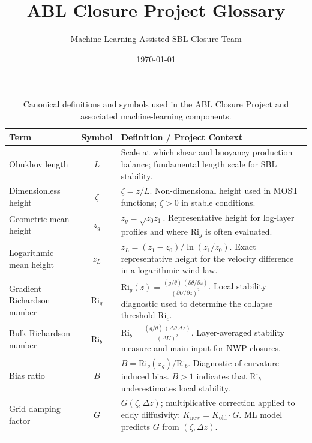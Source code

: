 \documentclass[11pt, a4paper]{article}
\title{ABL Closure Project Glossary}
\author{Machine Learning Assisted SBL Closure Team}
\date{\today}
\begin{document}
\begin{table}[t]
\centering
\renewcommand{\arraystretch}{1.35} %
\caption{Canonical definitions and symbols used in the ABL Closure Project and associated machine-learning components.}
\label{tab:abl-glossary}
\begin{tabularx}{\linewidth}{l c X}
\toprule
\textbf{Term} & \textbf{Symbol} & \textbf{Definition / Project Context} \\
\midrule

Obukhov length & $L$ & Scale at which shear and buoyancy production balance; fundamental length scale for SBL stability. \\
\addlinespace

Dimensionless height & $\zeta$ & $\zeta = z/L$. Non-dimensional height used in MOST functions; $\zeta>0$ in stable conditions. \\
\addlinespace

Geometric mean height & $z_g$ & $z_g = \sqrt{z_0 z_1}$. Representative height for log-layer profiles and where $\mathrm{Ri}_g$ is often evaluated. \\
\addlinespace

Logarithmic mean height & $z_L$ & $z_L = (z_1 - z_0) / \ln(z_1 / z_0)$. Exact representative height for the velocity difference in a logarithmic wind law. \\
\addlinespace

Gradient Richardson number & $\mathrm{Ri}_g$ & $\displaystyle \mathrm{Ri}_g(z)=\frac{(g/\theta)\,(\partial\theta/\partial z)}{(\partial U/\partial z)^2}$. Local stability diagnostic used to determine the collapse threshold $\mathrm{Ri}_c$. \\
\addlinespace

Bulk Richardson number & $\mathrm{Ri}_b$ & $\displaystyle \mathrm{Ri}_b=\frac{(g/\bar{\theta})\,(\Delta\theta\,\Delta z)}{(\Delta U)^2}$. Layer-averaged stability measure and main input for NWP closures. \\
\addlinespace

Bias ratio & $B$ & $B = \mathrm{Ri}_g(z_g) / \mathrm{Ri}_b$. Diagnostic of curvature-induced bias. $B>1$ indicates that $\mathrm{Ri}_b$ underestimates local stability. \\
\addlinespace

Grid damping factor & $G$ & $G(\zeta,\Delta z)$; multiplicative correction applied to eddy diffusivity: $K_{\text{new}} = K_{\text{old}} \cdot G$. $\text{ML}$ model predicts $G$ from $(\zeta,\Delta z)$. \\
\addlinespace


\end{tabularx}
\end{table}
\end{document}
